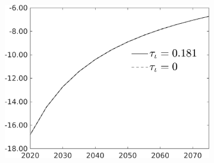 \begin{figure}[h!!]
\begin{subfigure}{0.9\textwidth}
\begin{minipage}[]{0.32\textwidth}
	\end{minipage}
\begin{minipage}[]{0.32\textwidth}
\includegraphics[width=1\textwidth]{../../codding_model/own_basedOnFried/optimalPol_010922_revision/figures/all_13Sept22/PerdifNoTauf_Equlab_regime0_CompTaul_sn_spillover0_nsk0_xgr0_knspil0_sep0_LFlimit0_emsbase0_countec0_GovRev0_etaa0.79_lgd1.png}
\end{minipage}
		\end{subfigure} 
		

\end{figure}
